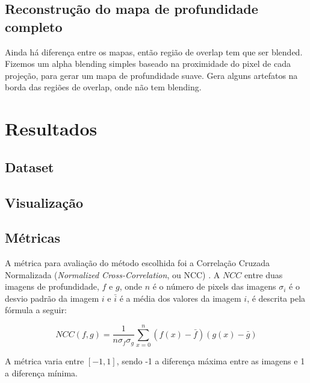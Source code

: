 \documentclass[cic,tc]{iiufrgs}
\begin{document}
\section{Reconstrução do mapa de profundidade completo}

Ainda há diferença entre os mapas, então região de overlap tem que ser blended. Fizemos um alpha blending simples baseado na proximidade do pixel de cada projeção, para gerar um mapa de profundidade suave. Gera alguns artefatos na borda das regiões de overlap, onde não tem blending.

\chapter{Resultados}
\section{Dataset}

\section{Visualização}


\section{Métricas}

A métrica para avaliação do método escolhida foi a Correlação Cruzada Normalizada (\textit{Normalized Cross-Correlation}, ou NCC) \citep{NCC2006}. A $NCC$ entre duas imagens de profundidade, $f$ e $g$, onde $n$ é o número de pixels das imagens $\sigma_i$ é o desvio padrão da imagem $i$ e $\bar{i}$ é a média dos valores da imagem $i$, é descrita pela fórmula a seguir:

$$NCC(f,g) = \frac{1}{n \sigma_f \sigma_g}\sum_{x=0}^{n}(f(x)-\bar{f})(g(x)-\bar{g})$$

A métrica varia entre $[-1,1]$, sendo -1 a diferença máxima entre as imagens e 1 a diferença mínima.
\end{document}
